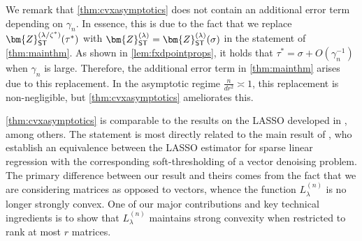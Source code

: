 \documentclass[10pt]{article}
\newcommand{\s}{^*}
\newcommand{\inv}{^{-1}}
\theoremstyle{definition}
\begin{document}
We remark that \cref{thm:cvxasymptotics} does not contain an additional error term depending on $\gamma_n$.  In essence, this is due to the fact that we replace $\bm{Z}_{{\sf ST}}^{(\lambda/\zeta\s)}(\tau\s)$ with $\bm{Z}_{{\sf ST}}^{(\lambda)} = \bm{Z}_{{\sf ST}}^{(\lambda)}(\sigma)$ in the statement of \cref{thm:mainthm}.   As shown in \cref{lem:fxdpointprops}, it holds that $\tau\s = \sigma + O(\gamma_n\inv)$ when $\gamma_n$ is large. Therefore, the additional error term  in \cref{thm:mainthm} arises  due to this replacement.  In the asymptotic regime $\frac{n}{d r^2} \asymp 1$, this replacement is non-negligible, but \cref{thm:cvxasymptotics} ameliorates this.  

\cref{thm:cvxasymptotics} is comparable to the results on the LASSO developed in \citet{miolane_distribution_2021,celentano_lasso_2023,javanmard_debiasing_2018}, among others.  The statement is most directly related to the main result of \citet{celentano_lasso_2023}, who establish an equivalence between the LASSO estimator for sparse linear regression with the corresponding soft-thresholding of a vector denoising problem.  The primary difference between our result and theirs comes from the fact that we are considering matrices as opposed to vectors, whence the function $L_{\lambda}^{(n)}$ is no longer strongly convex. One of our major contributions and key technical ingredients is to show that $L_{\lambda}^{(n)}$ maintains strong convexity when restricted to rank at most $r$ matrices.
\end{document}

